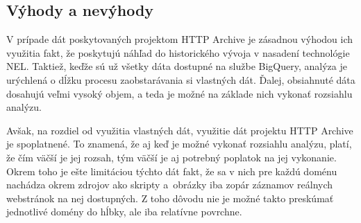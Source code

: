 \subsection{Výhody a nevýhody}

V prípade dát poskytovaných projektom HTTP Archive je zásadnou výhodou ich využitia fakt, že poskytujú náhľad do historického vývoja v nasadení technológie NEL.
Taktiež, keďže sú už všetky dáta dostupné na službe BigQuery, analýza je urýchlená o dĺžku procesu zaobstarávania si vlastných dát.
Ďalej, obsiahnuté dáta dosahujú veľmi vysoký objem, a teda je možné na základe nich vykonať rozsiahlu analýzu.

Avšak, na rozdiel od využitia vlastných dát, využitie dát projektu HTTP Archive je spoplatnené.
To znamená, že aj keď je možné vykonať rozsiahlu analýzu, platí, že čím väčší je jej rozsah, tým väčší je aj potrebný poplatok na jej vykonanie.
Okrem toho je ešte limitáciou týchto dát fakt, že sa v nich pre každú doménu nachádza okrem zdrojov ako skripty \mbox{a obrázky} iba zopár záznamov reálnych webstránok na nej dostupných. 
Z toho dôvodu nie je možné takto preskúmať jednotlivé domény do hĺbky, ale iba relatívne povrchne.